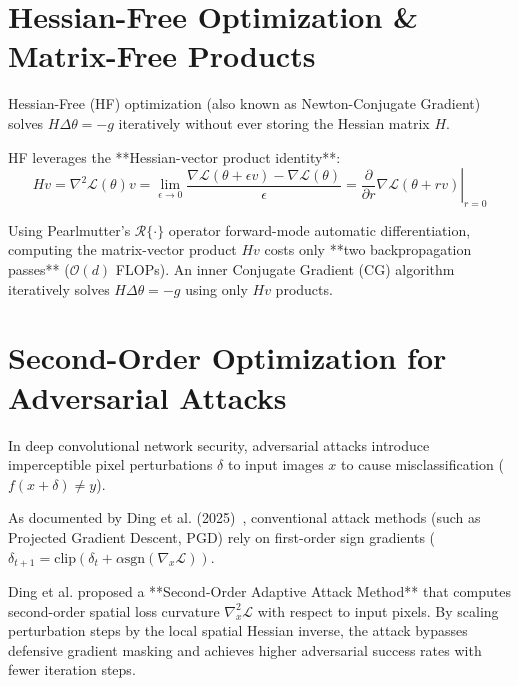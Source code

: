 \section{Hessian-Free Optimization \& Matrix-Free Products}
Hessian-Free (HF) optimization (also known as Newton-Conjugate Gradient) solves $H \Delta \theta = -g$ iteratively without ever storing the Hessian matrix $H$.

HF leverages the **Hessian-vector product identity**:
\begin{equation}
H v = \nabla^2 \mathcal{L}(\theta) v = \lim_{\epsilon \to 0} \frac{\nabla \mathcal{L}(\theta + \epsilon v) - \nabla \mathcal{L}(\theta)}{\epsilon} = \left. \frac{\partial}{\partial r} \nabla \mathcal{L}(\theta + r v) \right|_{r=0}
\end{equation}

Using Pearlmutter's $\mathcal{R}\{\cdot\}$ operator forward-mode automatic differentiation, computing the matrix-vector product $H v$ costs only **two backpropagation passes** ($\mathcal{O}(d)$ FLOPs). An inner Conjugate Gradient (CG) algorithm iteratively solves $H \Delta \theta = -g$ using only $H v$ products.


\section{Second-Order Optimization for Adversarial Attacks}
In deep convolutional network security, adversarial attacks introduce imperceptible pixel perturbations $\delta$ to input images $x$ to cause misclassification ($f(x + \delta) \neq y$).

As documented by Ding et al. (2025)~\cite{ding2025second}, conventional attack methods (such as Projected Gradient Descent, PGD) rely on first-order sign gradients ($\delta_{t+1} = \text{clip}(\delta_t + \alpha \text{sgn}(\nabla_x \mathcal{L}))$. 

Ding et al. proposed a **Second-Order Adaptive Attack Method** that computes second-order spatial loss curvature $\nabla_x^2 \mathcal{L}$ with respect to input pixels. By scaling perturbation steps by the local spatial Hessian inverse, the attack bypasses defensive gradient masking and achieves higher adversarial success rates with fewer iteration steps.
